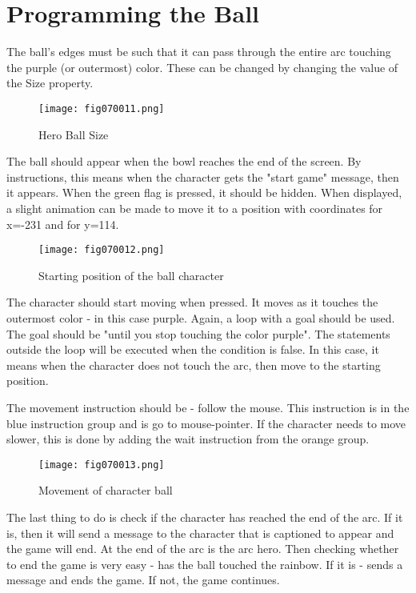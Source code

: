 \section{Programming the Ball}
The ball's edges must be such that it can pass through the entire arc touching the purple (or outermost) color. These can be changed by changing the value of the Size property.

\begin{figure}[H]
   \centering
   \texttt{[image: fig070011.png]}
   \caption{Hero Ball Size}
\label{fig070011}
\end{figure}

The ball should appear when the bowl reaches the end of the screen. By instructions, this means when the character gets the "start game" message, then it appears. When the green flag is pressed, it should be hidden. When displayed, a slight animation can be made to move it to a position with coordinates for x=-231 and for y=114.

\begin{figure}[H]
   \centering
   \texttt{[image: fig070012.png]}
   \caption{Starting position of the ball character}
\label{fig070012}
\end{figure}

The character should start moving when pressed. It moves as it touches the outermost color - in this case purple. Again, a loop with a goal should be used. The goal should be "until you stop touching the color purple". The statements outside the loop will be executed when the condition is false. In this case, it means when the character does not touch the arc, then move to the starting position.

The movement instruction should be - follow the mouse. This instruction is in the blue instruction group and is go to mouse-pointer. If the character needs to move slower, this is done by adding the wait instruction from the orange group.

\begin{figure}[H]
   \centering
   \texttt{[image: fig070013.png]}
   \caption{Movement of character ball}
\label{fig070013}
\end{figure}

The last thing to do is check if the character has reached the end of the arc. If it is, then it will send a message to the character that is captioned to appear and the game will end. At the end of the arc is the arc hero. Then checking whether to end the game is very easy - has the ball touched the rainbow. If it is - sends a message and ends the game. If not, the game continues.

